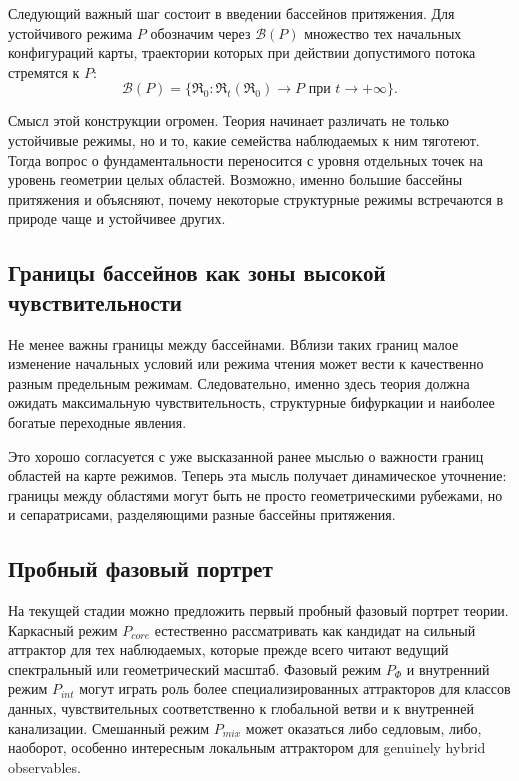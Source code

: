 \documentclass[12pt,a4paper]{article}
\begin{document}
Следующий важный шаг состоит в введении бассейнов притяжения. Для устойчивого режима \(P\) обозначим через \(\mathcal{B}(P)\) множество тех начальных конфигураций карты, траектории которых при действии допустимого потока стремятся к \(P\):
\begin{equation}
\mathcal{B}(P) = \{ \mathfrak{R}_0 : \mathfrak{R}_t(\mathfrak{R}_0) \to P \text{ при } t \to +\infty \}.
\end{equation}

Смысл этой конструкции огромен. Теория начинает различать не только устойчивые режимы, но и то, какие семейства наблюдаемых к ним тяготеют. Тогда вопрос о фундаментальности переносится с уровня отдельных точек на уровень геометрии целых областей. Возможно, именно большие бассейны притяжения и объясняют, почему некоторые структурные режимы встречаются в природе чаще и устойчивее других.

\subsection{Границы бассейнов как зоны высокой чувствительности}

Не менее важны границы между бассейнами. Вблизи таких границ малое изменение начальных условий или режима чтения может вести к качественно разным предельным режимам. Следовательно, именно здесь теория должна ожидать максимальную чувствительность, структурные бифуркации и наиболее богатые переходные явления.

Это хорошо согласуется с уже высказанной ранее мыслью о важности границ областей на карте режимов. Теперь эта мысль получает динамическое уточнение: границы между областями могут быть не просто геометрическими рубежами, но и сепаратрисами, разделяющими разные бассейны притяжения.

\subsection{Пробный фазовый портрет}

На текущей стадии можно предложить первый пробный фазовый портрет теории. Каркасный режим \(P_{core}\) естественно рассматривать как кандидат на сильный аттрактор для тех наблюдаемых, которые прежде всего читают ведущий спектральный или геометрический масштаб. Фазовый режим \(P_{\Phi}\) и внутренний режим \(P_{int}\) могут играть роль более специализированных аттракторов для классов данных, чувствительных соответственно к глобальной ветви и к внутренней канализации. Смешанный режим \(P_{mix}\) может оказаться либо седловым, либо, наоборот, особенно интересным локальным аттрактором для genuinely hybrid observables.
\end{document}
